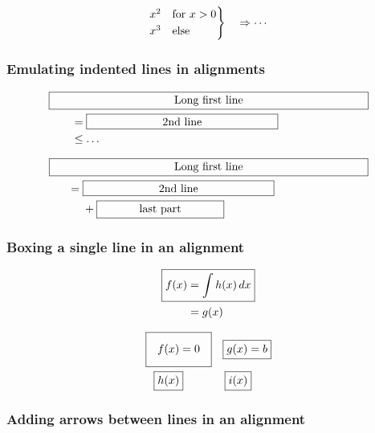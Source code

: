 \documentclass{article}
\begin{document}
\[
\begin{rcases*}
  x^2 & for $x>0$\\
  x^3 & else
\end{rcases*} \quad \Rightarrow\cdots
\]


\subsubsection{Emulating indented lines in alignments}
\begin{align*}
  \MoveEqLeft \framebox[10cm][c]{Long first line}\\
  & = \framebox[6cm][c]{2nd line}\\
  & \leq \dots
\end{align*}

\begin{align*}
  \MoveEqLeft[3] \framebox[10cm][c]{Long first line}\\
    = {} & \framebox[6cm][c]{2nd line}\\
        & + \framebox[4cm][c]{last part}
\end{align*}

\subsubsection{Boxing a single line in an alignment}

\begin{align*}
  \Aboxed{ f(x) & = \int h(x)\, dx} \\
                & = g(x)
\end{align*}

\begin{align*}
  \setlength\fboxsep{1em}
  \Aboxed{ f(x) &= 0 } & \Aboxed{ g(x) &= b} \\
  \Aboxed{ h(x) }      & \Aboxed{ i(x) }
\end{align*}

\newcommand\myboxA[1]{\fcolorbox{gray}{yellow}{#1}}
\newcommand\myboxB[1]{{\fboxsep=5pt\fboxrule=2pt\fbox{#1}}}

\subsubsection{Adding arrows between lines in an alignment}
\end{document}
